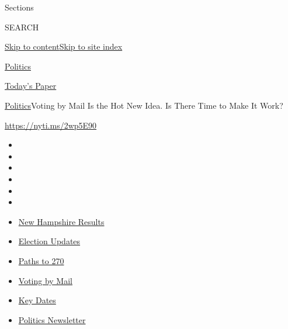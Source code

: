 Sections

SEARCH

\protect\hyperlink{site-content}{Skip to
content}\protect\hyperlink{site-index}{Skip to site index}

\href{https://www.nytimes3xbfgragh.onion/section/politics}{Politics}

\href{https://myaccount.nytimes3xbfgragh.onion/auth/login?response_type=cookie\&client_id=vi}{}

\href{https://www.nytimes3xbfgragh.onion/section/todayspaper}{Today's
Paper}

\href{/section/politics}{Politics}\textbar{}Voting by Mail Is the Hot
New Idea. Is There Time to Make It Work?

\url{https://nyti.ms/2wp5E90}

\begin{itemize}
\item
\item
\item
\item
\item
\item
\end{itemize}

\begin{itemize}
\item
  \href{https://www.nytimes3xbfgragh.onion/interactive/2020/09/08/us/elections/results-new-hampshire-primary-elections.html?action=click\&pgtype=Article\&state=default\&region=TOP_BANNER\&context=storylines_menu}{New
  Hampshire Results}
\item
  \href{https://www.nytimes3xbfgragh.onion/live/2020/09/08/us/trump-vs-biden?action=click\&pgtype=Article\&state=default\&region=TOP_BANNER\&context=storylines_menu}{Election
  Updates}
\item
  \href{https://www.nytimes3xbfgragh.onion/interactive/2020/us/elections/election-states-biden-trump.html?action=click\&pgtype=Article\&state=default\&region=TOP_BANNER\&context=storylines_menu}{Paths
  to 270}
\item
  \href{https://www.nytimes3xbfgragh.onion/interactive/2020/08/31/us/politics/vote-by-mail-deadlines.html?action=click\&pgtype=Article\&state=default\&region=TOP_BANNER\&context=storylines_menu}{Voting
  by Mail}
\item
  \href{https://www.nytimes3xbfgragh.onion/interactive/2019/us/elections/2020-presidential-election-calendar.html?action=click\&pgtype=Article\&state=default\&region=TOP_BANNER\&context=storylines_menu}{Key
  Dates}
\item
  \href{https://www.nytimes3xbfgragh.onion/newsletters/politics?action=click\&pgtype=Article\&state=default\&region=TOP_BANNER\&context=storylines_menu}{Politics
  Newsletter}
\end{itemize}

